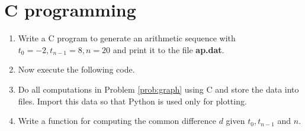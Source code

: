 \documentclass[journal,12pt,twocolumn]{IEEEtran}
\renewcommand\thesection{\arabic{section}}
\begin{document}
\section{C programming}
\begin{enumerate}[label=\thesection.\arabic*
,ref=\thesection.\theenumi]
\item Write a C program to generate an arithmetic sequence with $t_0 = -2, t_{n-1}= 8, n = 20$ and print it to 
the file \textbf{ap.dat}.
\\
\solution

\item Now execute the following code.

\item Do all computations in Problem \ref{prob:graph} using C and store the data into files.  Import this data 
so that Python is used only for plotting.
\item Write a function for computing the common difference $d$ given $t_0,t_{n-1}$ and $n$.
\\
\solution


\end{enumerate}
\end{document}
